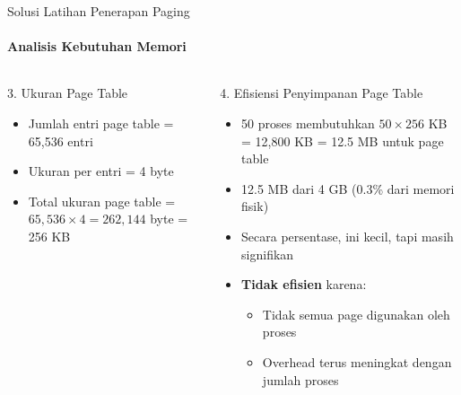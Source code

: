 \documentclass[10pt,aspectratio=169]{beamer}
\begin{document}
\begin{frame}{Solusi Latihan Penerapan Paging}
    \framesubtitle{Analisis Kebutuhan Memori}
    \begin{columns}[T]
            \begin{block}{3. Ukuran Page Table}
                \begin{itemize}
                    \item Jumlah entri page table = 65,536 entri
                    \item Ukuran per entri = 4 byte
                    \item Total ukuran page table = $65,536 \times 4 = 262,144$ byte = 256 KB
                \end{itemize}
            \end{block}
            
            \begin{alertblock}{4. Efisiensi Penyimpanan Page Table}
                \begin{itemize}
                    \item 50 proses membutuhkan $50 \times 256$ KB = 12,800 KB = 12.5 MB untuk page table
                    \item 12.5 MB dari 4 GB (0.3\% dari memori fisik)
                    \item Secara persentase, ini kecil, tapi masih signifikan
                    \item \textbf{Tidak efisien} karena:
                    \begin{itemize}
                        \item Tidak semua page digunakan oleh proses
                        \item Overhead terus meningkat dengan jumlah proses
                    \end{itemize}
                \end{itemize}
            \end{alertblock}
    \end{columns}
\end{frame}
\end{document}
